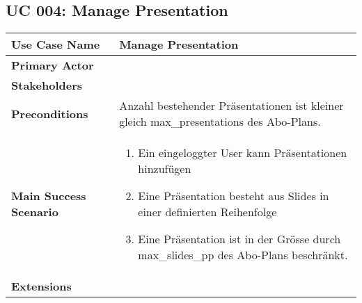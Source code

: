 \subsection{UC 004: Manage Presentation}
\label{uc:004-manage-pres}

\begin{tabular}{|l|p{}|}
\hline
\textbf{Use Case Name} 	&	Manage Presentation	\\ \hline
\textbf{Primary Actor} 	&		\\ \hline
\textbf{Stakeholders}	&		\\ \hline
\textbf{Preconditions}	&	Anzahl bestehender Präsentationen ist kleiner gleich max_presentations des Abo-Plans.	\\ \hline
\textbf{Main Success Scenario}	&
\begin{enumerate}
	\item Ein eingeloggter User kann Präsentationen hinzufügen
	\item Eine Präsentation besteht aus Slides in einer definierten Reihenfolge
	\item Eine Präsentation ist in der Grösse durch max_slides_pp des Abo-Plans beschränkt.
\end{enumerate}
\\ \hline
\textbf{Extensions}	& 	\\ \hline
\end{tabular}
